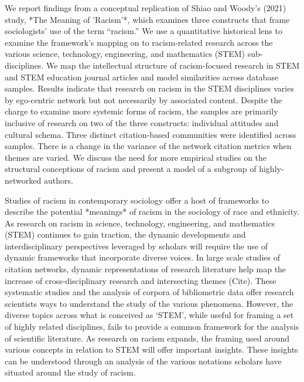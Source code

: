 {{We report findings from a conceptual replication of Shiao and Woody's (2021) study, *The Meaning of 'Racism'*, which examines three constructs that frame sociologists' use of the term ``racism.'' We use a quantitative historical lens to examine the framework's mapping on to racism-related research across the various science, technology, engineering, and mathematics (STEM) sub-disciplines. We map the intellectual structure of racism-focused research in STEM and STEM education journal articles and model similarities across database samples. Results indicate that research on racism in the STEM disciplines varies by ego-centric network but not necessarily by associated content. Despite the charge to examine more systemic forms of racism, the samples are primarily inclusive of research on two of the three constructs: individual attitudes and cultural schema. Three distinct citation-based communities were identified across samples. There is a change in the variance of the network citation metrics when themes are varied. We discuss the need for more empirical studies on the structural conceptions of racism and present a model of a subgroup of highly-networked authors.

Studies of racism in contemporary sociology offer a host of frameworks to describe the potential *meanings* of racism in the sociology of race and ethnicity. As research on racism in science, technology, engineering, and mathematics (STEM) continues to gain traction, the dynamic developments and interdisciplinary perspectives leveraged by scholars will require the use of dynamic frameworks that incorporate diverse voices. In large scale studies of citation networks, dynamic representations of research literature help map the increase of cross-disciplinary research and intersecting themes (Cite). These systematic studies and the analysis of corpora of bibliometric data offer research scientists ways to understand the study of the various phenomena. However, the diverse topics across what is conceived as `STEM', while useful for framing a set of highly related disciplines, fails to provide a common framework for the analysis of scientific literature. As research on racism expands, the framing used around various concepts in relation to STEM will offer important insights. These insights can be understood through an analysis of the various notations scholars have situated around the study of racism.

}}
